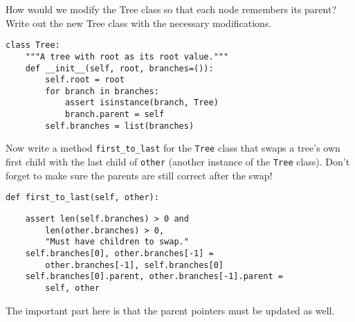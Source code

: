 \question
How would we modify the Tree class so that each node remembers its parent?
Write out the new Tree class with the necessary modifications.
\begin{solution}[1.5in]
\begin{lstlisting}
class Tree:
    """A tree with root as its root value."""
    def __init__(self, root, branches=()):
        self.root = root
        for branch in branches:
            assert isinstance(branch, Tree)
            branch.parent = self
        self.branches = list(branches)

\end{lstlisting}
\end{solution}

Now write a method {\tt first\_to\_last} for the {\tt Tree} class that swaps a
tree's own first child with the last child of {\tt other} (another instance of
the {\tt Tree} class). Don't forget to make sure the parents are still correct
after the swap!
\begin{lstlisting}
def first_to_last(self, other):
\end{lstlisting}
\begin{solution}[1.0in]
\begin{lstlisting}
    assert len(self.branches) > 0 and
        len(other.branches) > 0,
        "Must have children to swap."
    self.branches[0], other.branches[-1] =
        other.branches[-1], self.branches[0]
    self.branches[0].parent, other.branches[-1].parent =
        self, other
\end{lstlisting}
The important part here is that the parent pointers must be updated as well.
\end{solution}
